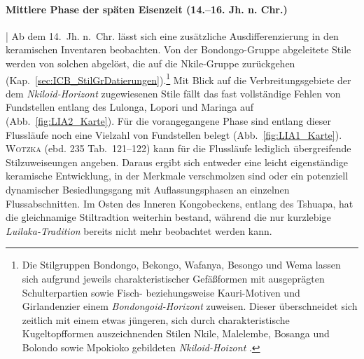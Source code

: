 \paragraph{Mittlere Phase der späten Eisenzeit (14.--16. Jh. n. Chr.)}\hspace{-.5em}|\hspace{.5em}%
Ab dem 14.~Jh. n.~Chr. lässt sich eine zusätzliche Ausdifferenzierung in den keramischen Inventaren beobachten. Von der Bondongo-Gruppe abgeleitete Stile werden von solchen abgelöst, die auf die Nkile-Gruppe zurückgehen (Kap.~\ref{sec:ICB_StilGrDatierungen}).\footnote{Die Stilgruppen Bondongo, Bekongo, Wafanya, Besongo und Wema lassen sich aufgrund jeweils charakteristischer Gefäßformen mit ausgeprägten Schulterpartien sowie Fisch- beziehungsweise Kauri-Motiven und Girlandenzier einem \textit{Bondongoid-Horizont} zuweisen. Dieser überschneidet sich zeitlich mit einem etwas jüngeren, sich durch charakteristische Kugeltopfformen auszeichnenden Stilen Nkile, Malelembe, Bosanga und Bolondo sowie Mpokioko gebildeten \textit{Nkiloid-Hoizont} \parencites[287\,f.]{Eggert.1983}[224\,f.; Kap.~\ref{sec:Horizonte}]{Wotzka.1995}.} Mit Blick auf die Verbreitungsgebiete der dem \textit{Nkiloid-Horizont} zugewiesenen Stile fällt das fast vollständige Fehlen von Fundstellen entlang des Lulonga, Lopori und Maringa auf (Abb.~\ref{fig:LIA2_Karte}). Für die vorangegangene Phase sind entlang dieser Flussläufe noch eine Vielzahl von Fundstellen belegt (Abb.~\ref{fig:LIA1_Karte}). \textsc{Wotzka} (ebd. 235 Tab.~121--122) kann für die Flussläufe lediglich übergreifende Stilzuweiseungen angeben. Daraus ergibt sich entweder eine leicht eigenständige keramische Entwicklung, in der Merkmale verschmolzen sind oder ein potenziell dynamischer Besiedlungsgang mit Auflassungsphasen an einzelnen Flussabschnitten. Im Osten des Inneren Kongobeckens, entlang des Tshuapa, hat die gleichnamige Stiltradtion weiterhin bestand, während die nur kurzlebige \textit{Luilaka-Tradition} bereits nicht mehr beobachtet werden kann.


